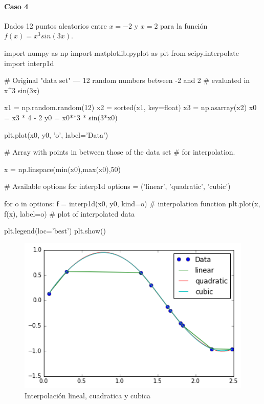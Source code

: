 \documentclass[12pt,spanish]{article}
\begin{document}
\newpage

\paragraph{Caso 4}

Dados 12 puntos aleatorios entre $x=-2$ y $x=2$ para la función $f(x) = x^3 sin(3 x)$.


\begin{center}
\begin{boxedverbatim}

import numpy as np
import matplotlib.pyplot as plt
from scipy.interpolate import interp1d

# Original "data set" --- 12 random numbers between -2 and 2
# evaluated in x^3 sin(3x)

x1 = np.random.random(12)
x2 = sorted(x1, key=float)
x3 = np.asarray(x2)
x0 = x3 * 4 - 2
y0 = x0**3 * sin(3*x0)

plt.plot(x0, y0, 'o', label='Data')

# Array with points in between those of the data set
# for interpolation.

x = np.linspace(min(x0),max(x0),50)

# Available options for interp1d
options = ('linear', 'quadratic', 'cubic')

for o in options:
    f = interp1d(x0, y0, kind=o)  # interpolation function
    plt.plot(x, f(x), label=o)    # plot of interpolated data

plt.legend(loc='best')
plt.show()
\end{boxedverbatim}
\end{center}

\begin{figure}[H]
    \centering
	\includegraphics[height=7.5cm]{caso1.png}
    \caption{Interpolación lineal, cuadratica y cubica}
\end{figure}
\end{document}
